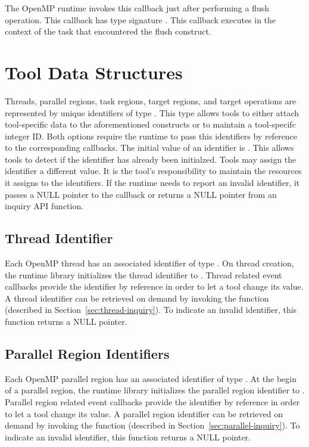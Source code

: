 \documentclass{article}
\newcommand{\descheader}[1]{{\needspace{3\baselineskip}\vspace{1em}\noindent \fbox{#1}}}
\begin{document}
\descheader{Miscellaneous}

\begin{description}

\item {}

 \sloppy
   The OpenMP runtime invokes this callback just after
   performing a flush operation.  
   This callback has type signature . 
   This callback executes in the context of the task that encountered the flush construct.
\end{description}

\section{Tool Data Structures}
\label{sec:data}

Threads, parallel regions, task regions, target regions, and target operations are represented by unique identifiers of type .
This type allows tools to either attach tool-specific data to the aforementioned constructs or to maintain a tool-specifc integer ID.
Both options require the runtime to pass this identifiers by reference to the corresponding callbacks.
The initial value of an identifier is . This allows tools to detect if the identifier has already been initialzed.
Tools may assign the identifier a different value.
It is the tool's responsibility to maintain the resources it assigns to the identifiers.
If the runtime needs to report an invalid identifier, it passes a NULL pointer to the callback or returns a NULL pointer from an inquiry API function.

\subsection{Thread Identifier}
  Each OpenMP thread has an associated identifier of type .
  On thread creation, the runtime library initializes the thread identifier to .
  Thread related event callbacks provide the identifier by reference in order to let a tool change its value.
  A thread identifier can be retrieved on demand by invoking the function (described in Section~\ref{sec:thread-inquiry}).
  To indicate an invalid identifier, this function returns a NULL pointer.

\subsection{Parallel Region Identifiers}
  Each OpenMP parallel region has an associated identifier of type .
  At the begin of a parallel region, the runtime library initializes the parallel region identifier to .
  Parallel region related event callbacks provide the identifier by reference in order to let a tool change its value.
  A parallel region identifier can be retrieved on demand by invoking the  function (described in Section~\ref{sec:parallel-inquiry}).
  To indicate an invalid identifier, this function returns a NULL pointer.
 
\end{document}
